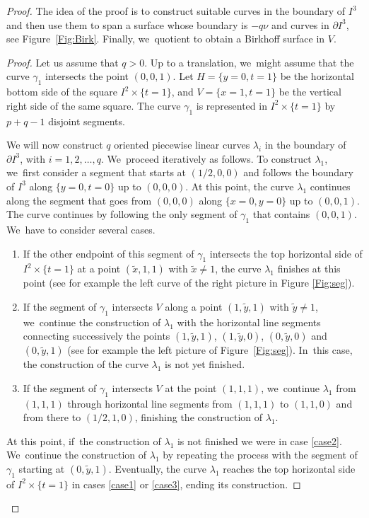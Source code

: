 \documentclass[11pt]{article}
\theoremstyle{definition}
\begin{document}
\begin{proof}
The idea of the proof is to construct suitable curves in the boundary of $I^3$ and then use them to span a surface whose boundary is $-q\nu$ and curves in $\partial I^3$, see Figure~\ref{Fig:Birk}. Finally, we~quotient to obtain a Birkhoff surface in $V$.

\begin{proof}
Let us assume that $q>0$. Up to a translation, we~might assume that the curve $\gamma_1$ intersects the point $(0,0,1)$. Let $H=\{y=0, t=1\}$ be the horizontal bottom side of the square $I^2\times \{t=1\}$, and $V=\{x=1, t=1\}$ be the vertical right side of the same square. The curve $\gamma_1$ is represented in $I^2\times \{t=1\}$ by $p+q-1$ disjoint segments.

We will now construct $q$ oriented piecewise linear curves $\lambda_i$ in the boundary of $\partial I^3$, with $i=1,2,\ldots,q$. We~proceed iteratively as follows. To construct $\lambda_1$, we~first consider a segment that starts at $(1/2,0,0)$ and follows the boundary of $I^3$ along $\{y=0,t=0\}$ up to $(0,0,0)$. At this point, the curve $\lambda_1$ continues along the segment that goes from $(0,0,0)$ along $\{x=0, y=0\}$ up to $(0,0,1)$. The curve continues by following the only segment of $\gamma_1$ that contains $(0,0,1)$. We~have to consider several cases.
\begin{enumerate}
\item\label{case1} If the other endpoint of this segment of $\gamma_1$ intersects the top horizontal side of $I^2\times\{t=1\}$ at a point $(\widetilde x,1 ,1)$ with $\widetilde x\neq 1$, the curve $\lambda_1$ finishes at this point (see for example the left curve of the right picture in Figure \ref{Fig:seg}).
\item\label{case2} If the segment of $\gamma_1$ intersects $V$ along a point $(1, \widetilde y, 1)$ with $\widetilde y\neq 1$, we~continue the construction of $\lambda_1$ with the horizontal line segments connecting successively the points $(1,\widetilde y, 1)$, $(1,\widetilde y, 0)$, $(0,\widetilde y,0)$ and $(0,\widetilde y, 1)$ (see for example the left picture of Figure~\ref{Fig:seg}). In~this case, the construction of the curve $\lambda_1$ is not yet finished.
\item\label{case3} If the segment of $\gamma_1$ intersects $V$ at the point $(1, 1, 1)$, we~continue $\lambda_1$ from $(1,1,1)$ through horizontal line segments from $(1,1,1)$ to $(1,1,0)$ and from there to $(1/2,1,0)$, finishing the construction of $\lambda_1$.
\end{enumerate}
At this point, if~the construction of $\lambda_1$ is not finished we were in case \eqref{case2}. We~continue the construction of $\lambda_1$ by repeating the process with the segment of $\gamma_1$ starting at $(0,\widetilde y,1)$. Eventually, the curve $\lambda_1$ reaches the top horizontal side of $I^2\times\{t=1\}$ in cases \eqref{case1} or \eqref{case3}, ending its construction.


\end{proof}
\end{proof}
\end{document}
